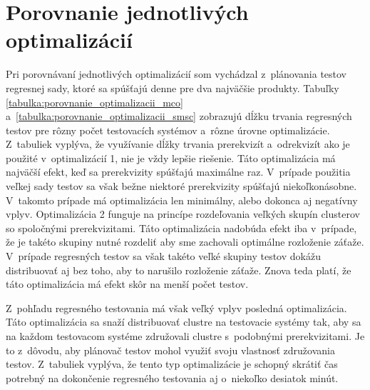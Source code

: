 \section{Porovnanie jednotlivých optimalizácií}
\label{sekcia:porovnanie_optimalizacii}
Pri porovnávaní jednotlivých optimalizácií som vychádzal z~plánovania testov
regresnej sady, ktoré sa spúšťajú denne pre dva najväčšie produkty. 
Tabuľky \ref{tabulka:porovnanie_optimalizacii_mco}
a~\ref{tabulka:porovnanie_optimalizacii_smsc} zobrazujú dĺžku trvania
regresných testov pre rôzny počet testovacích systémov a~rôzne úrovne
optimalizácie. Z~tabuliek vyplýva, že využívanie dĺžky trvania prerekvizít
a~odrekvizít ako je použité v~optimalizácií 1, nie je vždy lepšie riešenie.
Táto optimalizácia má najväčší efekt, keď sa prerekvizity spúšťajú maximálne
raz. V~prípade použitia veľkej sady testov sa však bežne niektoré prerekvizity
spúšťajú niekoľkonásobne. V~takomto prípade má optimalizácia len minimálny,
alebo dokonca aj negatívny vplyv. Optimalizácia 2 funguje na princípe rozdeľovania
veľkých skupín clusterov so spoločnými prerekvizitami. Táto optimalizácia
nadobúda efekt iba v~prípade, že je takéto skupiny nutné rozdeliť aby sme 
zachovali optimálne rozloženie záťaže. V~prípade regresných testov sa však 
takéto veľké skupiny testov dokážu distribuovať aj bez toho, aby to narušilo
rozloženie záťaže. Znova teda platí, že táto optimalizácia má efekt skôr na
menší počet testov. 

Z~pohľadu regresného testovania má však veľký vplyv posledná optimalizácia.
Táto optimalizácia sa snaží distribuovať clustre na testovacie systémy tak,
aby sa na každom testovacom systéme združovali clustre s~podobnými prerekvizitami.
Je to z~dôvodu, aby plánovač testov mohol využiť svoju vlastnosť združovania
testov. Z~tabuliek vyplýva, že tento typ optimalizácie je schopný skrátiť
čas potrebný na dokončenie regresného testovania aj o~niekoľko desiatok minút.


